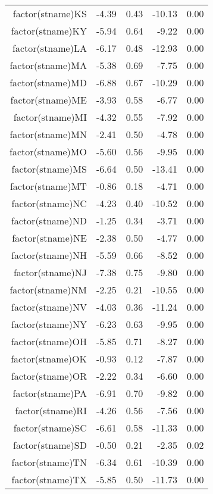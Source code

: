 \begin{table}[ht]
\begin{tabular}{rrrrr}
  factor(stname)KS & -4.39 & 0.43 & -10.13 & 0.00 \\ 
  factor(stname)KY & -5.94 & 0.64 & -9.22 & 0.00 \\ 
  factor(stname)LA & -6.17 & 0.48 & -12.93 & 0.00 \\ 
  factor(stname)MA & -5.38 & 0.69 & -7.75 & 0.00 \\ 
  factor(stname)MD & -6.88 & 0.67 & -10.29 & 0.00 \\ 
  factor(stname)ME & -3.93 & 0.58 & -6.77 & 0.00 \\ 
  factor(stname)MI & -4.32 & 0.55 & -7.92 & 0.00 \\ 
  factor(stname)MN & -2.41 & 0.50 & -4.78 & 0.00 \\ 
  factor(stname)MO & -5.60 & 0.56 & -9.95 & 0.00 \\ 
  factor(stname)MS & -6.64 & 0.50 & -13.41 & 0.00 \\ 
  factor(stname)MT & -0.86 & 0.18 & -4.71 & 0.00 \\ 
  factor(stname)NC & -4.23 & 0.40 & -10.52 & 0.00 \\ 
  factor(stname)ND & -1.25 & 0.34 & -3.71 & 0.00 \\ 
  factor(stname)NE & -2.38 & 0.50 & -4.77 & 0.00 \\ 
  factor(stname)NH & -5.59 & 0.66 & -8.52 & 0.00 \\ 
  factor(stname)NJ & -7.38 & 0.75 & -9.80 & 0.00 \\ 
  factor(stname)NM & -2.25 & 0.21 & -10.55 & 0.00 \\ 
  factor(stname)NV & -4.03 & 0.36 & -11.24 & 0.00 \\ 
  factor(stname)NY & -6.23 & 0.63 & -9.95 & 0.00 \\ 
  factor(stname)OH & -5.85 & 0.71 & -8.27 & 0.00 \\ 
  factor(stname)OK & -0.93 & 0.12 & -7.87 & 0.00 \\ 
  factor(stname)OR & -2.22 & 0.34 & -6.60 & 0.00 \\ 
  factor(stname)PA & -6.91 & 0.70 & -9.82 & 0.00 \\ 
  factor(stname)RI & -4.26 & 0.56 & -7.56 & 0.00 \\ 
  factor(stname)SC & -6.61 & 0.58 & -11.33 & 0.00 \\ 
  factor(stname)SD & -0.50 & 0.21 & -2.35 & 0.02 \\ 
  factor(stname)TN & -6.34 & 0.61 & -10.39 & 0.00 \\ 
  factor(stname)TX & -5.85 & 0.50 & -11.73 & 0.00 \\ 

\end{tabular}
\end{table}

